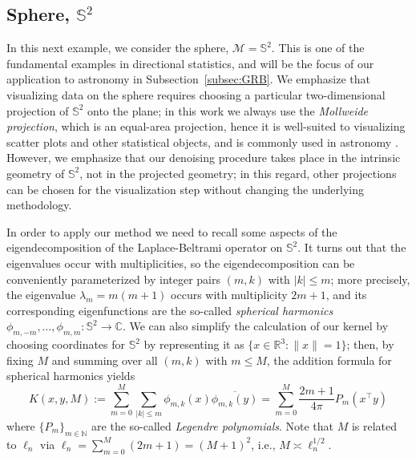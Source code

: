 \documentclass[preprint]{imsart}
\theoremstyle{plain}
\theoremstyle{definition}
\newcommand{\Rbb}{\mathbb{R}}
\newcommand{\Nbb}{\mathbb{N}}
\newcommand{\Cbb}{\mathbb{C}}
\newcommand{\Mcal}{\mathcal{M}}
\newcommand{\T}{\mathcal{T}}
\begin{document}

\subsection{Sphere, $\mathbb{S}^2$}\label{subsec:sim-sphere}

In this next example, we consider the sphere, $\Mcal=\mathbb{S}^2$.
This is one of the fundamental examples in directional statistics, and will be the focus of our application to astronomy in Subsection~\ref{subsec:GRB}.
We emphasize that visualizing data on the sphere requires choosing a particular two-dimensional projection of $\mathbb{S}^2$ onto the plane; in this work we always use the \textit{Mollweide projection}, which is an equal-area projection, hence it is well-suited to visualizing scatter plots and other statistical objects, and is commonly used in astronomy \cite{Tirion}.
However, we emphasize that our denoising procedure takes place in the intrinsic geometry of $\mathbb{S}^2$, not in the projected geometry; in this regard, other projections can be chosen for the visualization step without changing the underlying methodology.

In order to apply our method we need to recall some aspects of the eigendecomposition of the Laplace-Beltrami operator on $\mathbb{S}^2$.
It turns out that the eigenvalues occur with multiplicities, so the eigendecomposition can be conveniently parameterized by integer pairs $(m,k)$ with $|k|\le m$;
more precisely, the eigenvalue $\lambda_{m} = m(m+1)$ occurs with multiplicity $2m+1$, and its corresponding eigenfunctions are the so-called \textit{spherical harmonics} $\phi_{m,-m},\ldots, \phi_{m,m}:\mathbb{S}^2\to\Cbb$.
We can also simplify the calculation of our kernel by choosing coordinates for $\mathbb{S}^2$ by representing it as $\{x\in\Rbb^3: \|x\|=1\}$; then, by fixing $M$ and summing over all $(m,k)$ with $m\le M$, the addition formula for spherical harmonics yields
\begin{equation*}
    K(x,y,M):=\sum_{m=0}^{M}\sum_{|k|\le m}\phi_{m,k}(x)\overline{\phi_{m,k}(y)} = \sum_{m=0}^{M}\frac{2m+1}{4\pi}P_{m}\left(x^{\top} y\right)
\end{equation*}
where $\{P_{m}\}_{m\in\Nbb}$ are the so-called \textit{Legendre polynomials}.
Note that $M$ is related to $\ell_n$ via $\ell_n =\sum_{m=0}^{M}(2m+1)=(M+1)^2$, i.e., $M\asymp \ell_n^{1/2}$.
\end{document}
